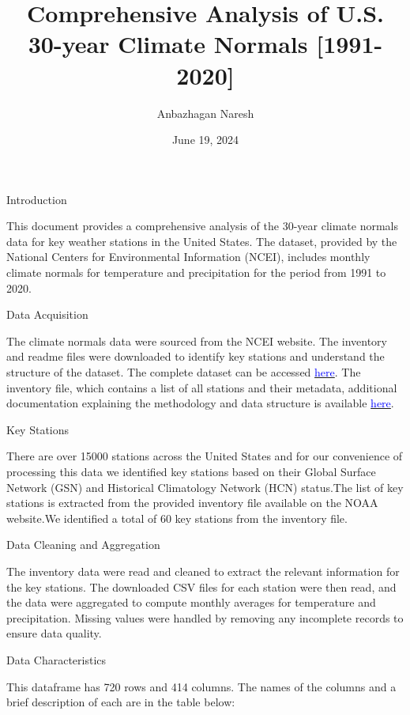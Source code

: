 \documentclass[
]{article}
\title{Comprehensive Analysis of U.S. 30-year Climate Normals
{[}1991-2020{]}}
\author{Anbazhagan Naresh}
\date{June 19, 2024}
\begin{document}
\maketitle

Introduction

\justifying

This document provides a comprehensive analysis of the 30-year climate
normals data for key weather stations in the United States. The dataset,
provided by the National Centers for Environmental Information (NCEI),
includes monthly climate normals for temperature and precipitation for
the period from 1991 to 2020.

Data Acquisition

\justifying

The climate normals data were sourced from the NCEI website. The
inventory and readme files were downloaded to identify key stations and
understand the structure of the dataset. The complete dataset can be
accessed
\href{https://www.ncei.noaa.gov/data/normals-monthly/1991-2020/access/}{\textcolor{blue}{here}}.
The inventory file, which contains a list of all stations and their
metadata, additional documentation explaining the methodology and data
structure is available
\href{https://www.ncei.noaa.gov/data/normals-monthly/1991-2020/doc/}{\textcolor{blue}{here}}.

Key Stations

\justifying

There are over 15000 stations across the United States and for our
convenience of processing this data we identified key stations based on
their Global Surface Network (GSN) and Historical Climatology Network
(HCN) status.The list of key stations is extracted from the provided
inventory file available on the NOAA website.We identified a total of 60
key stations from the inventory file.

Data Cleaning and Aggregation

\justifying

The inventory data were read and cleaned to extract the relevant
information for the key stations. The downloaded CSV files for each
station were then read, and the data were aggregated to compute monthly
averages for temperature and precipitation. Missing values were handled
by removing any incomplete records to ensure data quality.

Data Characteristics

\justifying

This dataframe has 720 rows and 414 columns. The names of the columns
and a brief description of each are in the table below:
\end{document}
